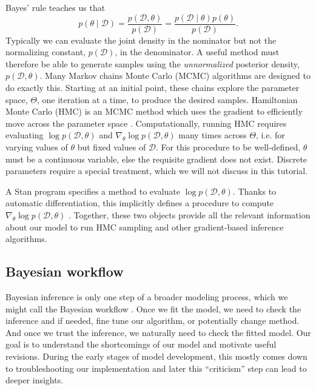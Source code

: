 Bayes' rule teaches us that
\begin{equation*}
  p(\theta \mid \mathcal D) = \frac{p(\mathcal D, \theta)}{p(\mathcal D)} =  \frac{p(\mathcal D \mid \theta) p(\theta)}{p(\mathcal D)}.
\end{equation*}
Typically we can evaluate the joint density in the nominator but not the normalizing constant, $p(\mathcal D)$, in the denominator.
%
A useful method must therefore be able to generate samples using the \textit{unnormalized} posterior density, $p(\mathcal D, \theta)$.
Many Markov chains Monte Carlo (MCMC) algorithms are designed to do exactly this.
Starting at an initial point, these chains explore the parameter space, $\Theta$, one iteration at a time, to produce the desired samples.
%
Hamiltonian Monte Carlo (HMC) is an MCMC method which uses the gradient to efficiently move across the parameter space \cite{Neal:2012, Betancourt:2018}.
Computationally, running HMC requires evaluating $\log p(\mathcal D, \theta)$ and $\nabla_\theta \log p(\mathcal D, \theta)$ many times across $\Theta$, i.e. for varying values of $\theta$ but fixed values of $\mathcal D$.
For this procedure to be well-defined, $\theta$ must be a continuous variable, else the requisite gradient does not exist.
Discrete parameters require a special treatment, which we will not discuss in this tutorial.

A Stan program specifies a method to evaluate $\log p(\mathcal D, \theta)$.
Thanks to automatic differentiation, this implicitly defines a procedure to compute $\nabla_\theta \log p(\mathcal D, \theta)$ \cite{Griewank:2008, Baydin:2018, Margossian:2019}.
Together, these two objects provide all the relevant information about our model to run HMC sampling and other gradient-based inference algorithms.

\subsection{Bayesian workflow}

Bayesian inference is only one step of a broader modeling process, which we might call the Bayesian workflow \cite{Betancourt:2018, Gabry:2019, Gelman:2020}.
Once we fit the model, we need to check the inference and if needed, fine tune our algorithm, or potentially change method.
And once we trust the inference, we naturally need to check the fitted model.
Our goal is to understand the shortcomings of our model and motivate useful revisions.
During the early stages of model development, this mostly comes down to troubleshooting our implementation and later this ``criticism'' step can lead to deeper insights.

